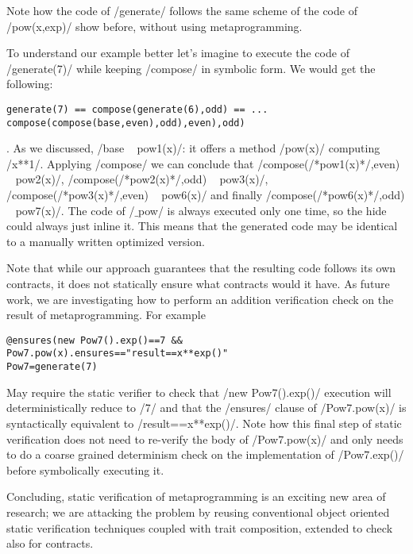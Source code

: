 Note how the code of /generate/ follows the same scheme of the code of /pow(x,exp)/ show before, without using metaprogramming.

To understand our example better let's imagine to execute the code of /generate(7)/ while keeping /compose/ in symbolic form. We would get the following:
\begin{lstlisting}
generate(7) == compose(generate(6),odd) == ...
compose(compose(base,even),odd),even),odd)
\end{lstlisting}.
As we discussed, /base ~ pow1(x)/: it offers a method /pow(x)/ computing /x**1/. Applying /compose/ we can conclude that
/compose(/*pow1(x)*/,even) ~ pow2(x)/,
/compose(/*pow2(x)*/,odd) ~ pow3(x)/,
/compose(/*pow3(x)*/,even) ~ pow6(x)/ and finally
/compose(/*pow6(x)*/,odd) ~ pow7(x)/.
The code of /$\_$pow/ is always executed only one time, so the hide could always just inline it.
This means that the generated code may be identical to a manually written optimized version.

Note that while our approach guarantees that the resulting code follows its own contracts, it does not statically ensure what contracts would it have.
As future work, we are investigating how
to perform an addition verification check
on the result of metaprogramming.
For example
\begin{lstlisting}
@ensures(new Pow7().exp()==7 && Pow7.pow(x).ensures=="result==x**exp()"
Pow7=generate(7)
\end{lstlisting}
May require the static verifier to check that 
/new Pow7().exp()/ execution will deterministically reduce to /7/ and that the /ensures/ clause of 
/Pow7.pow(x)/ is syntactically equivalent to 
/result==x**exp()/. Note how this final step of static verification does not need to re-verify the body of
/Pow7.pow(x)/ and only needs to do a coarse grained 
determinism check on the implementation of /Pow7.exp()/ before symbolically executing it.


Concluding, static verification of metaprogramming is an exciting new area of research; we are attacking the problem by reusing conventional
object oriented static verification techniques coupled with trait composition, extended to check also for contracts.